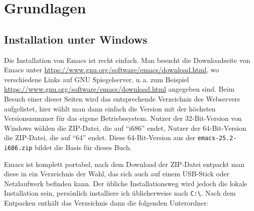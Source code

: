 \documentclass[12pt,ngerman]{scrbook}
\begin{document}
\chapter{Grundlagen}

\section{Installation unter Windows}

Die Installation von Emacs ist recht einfach. Man besucht die Downloadseite von Emacs unter \url{https://www.gnu.org/software/emacs/download.html}, wo verschiedene Links auf GNU Spiegelserver, u.\,a. zum Beispiel \url{https://www.gnu.org/software/emacs/download.html} angegeben sind. 
Beim Besuch einer dieser Seiten wird das entsprechende Verzeichnis des Webservers aufgelistet, hier wählt man dann einfach die Version mit der höchsten Versionsnummer für das eigene Betriebssystem. 
Nutzer der 32-Bit-Version von Windows wählen die ZIP-Datei, die auf \enquote{i686} endet, Nutzer der 64-Bit-Version die ZIP-Datei, die auf \enquote{64} endet. Diese 64-Bit-Version aus der \texttt{emacs-25.2-i686.zip} bildet die Basis für dieses Buch. 

Emacs ist komplett portabel, nach dem Download der ZIP-Datei entpackt man diese in ein Verzeichnis der Wahl, das sich auch auf einem USB-Stick oder Netzlaufwerk befinden kann.
Der übliche Installationsweg wird jedoch die lokale Installation sein, persönlich installiere ich üblicherweise nach \texttt{C:\textbackslash}. Nach dem Entpacken enthält das Verzeichnis dann die folgenden Unterordner:
\end{document}
